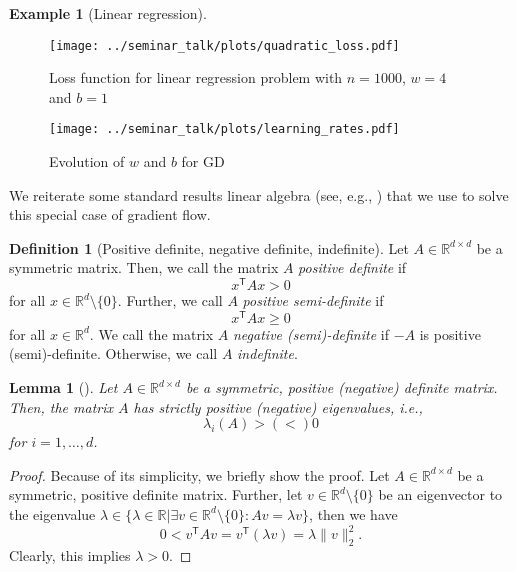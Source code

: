 \documentclass[12pt]{article}
\newtheorem{lemma}[lemma]{Lemma}
\theoremstyle{definition}
\newtheorem{example}[example]{Example}
\newtheorem{definition}[definition]{Definition}
\numberwithin{equation}{section}
\newcommand{\R}{\mathbb{R}}
\newcommand{\T}{\mathsf{T}}
\newcommand{\norm}[1]{\lVert{#1}\rVert_2}
\begin{document}
\begin{example}[Linear regression]
  \begin{figure}[htb]
    \centering
    \texttt{[image: ../seminar\_talk/plots/quadratic\_loss.pdf]}
    \caption{Loss function for linear regression problem with $n=1000$, $w=4$ and $b=1$}
    \label{fig:quadratic_loss_function}
  \end{figure}

  \begin{figure}[htb]
    \centering
    \texttt{[image: ../seminar\_talk/plots/learning\_rates.pdf]}
    \caption{Evolution of $w$ and $b$ for GD}
    \label{fig:learning_rates}
  \end{figure}

 
\end{example}

We reiterate some standard results linear algebra (see, e.g., \cite[pp.~250]{romanAdvancedLinearAlgebra2010}) that we use to solve this special case of gradient flow.
\begin{definition}[Positive definite, negative definite, indefinite]
  \label{def:pos_neg_def}
  Let $A \in \R^{d \times d}$ be a symmetric matrix. Then, we call the matrix $A$ \emph{positive definite} if
  \begin{equation*}
    x^\T A x > 0
  \end{equation*}
  for all $x \in \R^d \setminus \{0\}$. Further, we call $A$ \emph{positive semi-definite} if
  \begin{equation*}
    x^\T A x \geq 0
  \end{equation*}
  for all $x \in \R^d$. We call the matrix $A$ \emph{negative (semi)-definite} if $-A$ is positive (semi)-definite.
  Otherwise, we call $A$ \emph{indefinite}.
\end{definition}
\begin{lemma}[]
  \label{lem:positive_eigen_values}
  Let $A \in \R^{d \times d}$ be a symmetric, positive (negative) definite matrix. Then, the matrix $A$ has strictly positive (negative) eigenvalues, i.e.,
  \begin{equation*}
    \lambda_i(A) > (<) 0
  \end{equation*}
  for $i = 1, \dots, d$.
\end{lemma}
\begin{proof}
  Because of its simplicity, we briefly show the proof. Let $A \in \R^{d \times d}$ be a symmetric, positive definite matrix. Further, let $v \in \R^d \setminus \{0\}$ be an eigenvector to the eigenvalue $\lambda \in \{\lambda \in \R | \exists v \in \R^d \setminus \{0\}: Av = \lambda v \}$, then we have
  \begin{equation*}
    0 < v^\T A v = v^\T (\lambda v) = \lambda \norm{v}^2.
  \end{equation*}
  Clearly, this implies $\lambda > 0$.
\end{proof}
\end{document}
